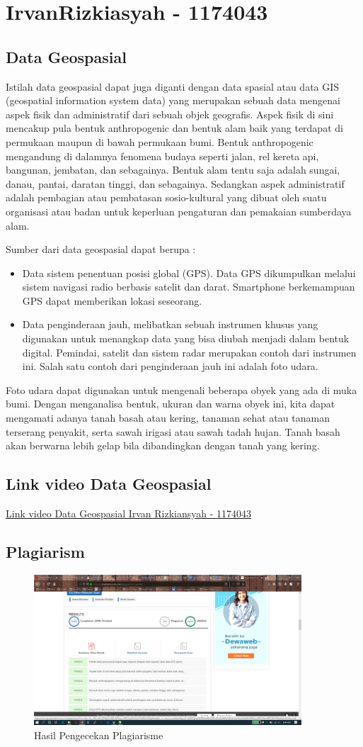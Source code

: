 \section{IrvanRizkiasyah - 1174043}
	\subsection{Data Geospasial}
	Istilah data geospasial dapat juga diganti dengan data spasial atau data GIS (geospatial information system data) yang merupakan sebuah data mengenai aspek fisik dan administratif dari sebuah objek geografis. Aspek fisik di sini mencakup pula bentuk anthropogenic dan bentuk alam baik yang terdapat di permukaan maupun di bawah permukaan bumi. Bentuk anthropogenic mengandung di dalamnya fenomena budaya seperti jalan, rel kereta api, bangunan, jembatan, dan sebagainya. Bentuk alam tentu saja adalah sungai, danau, pantai, daratan tinggi, dan sebagainya. Sedangkan aspek administratif adalah pembagian atau pembatasan sosio-kultural yang dibuat oleh suatu organisasi atau badan untuk keperluan pengaturan dan pemakaian sumberdaya alam.
	
	Sumber dari data geospasial dapat berupa :
	\begin{itemize}
		\item Data sistem penentuan posisi global (GPS). Data GPS dikumpulkan melalui sistem navigasi radio berbasis satelit dan darat. Smartphone berkemampuan GPS dapat memberikan lokasi seseorang.
		\item Data penginderaan jauh, melibatkan sebuah instrumen khusus yang digunakan untuk menangkap data yang bisa diubah menjadi dalam bentuk digital. Pemindai, satelit dan sistem radar merupakan contoh dari instrumen ini. Salah satu contoh dari penginderaan jauh ini adalah foto udara.
	\end{itemize}
	
	Foto udara dapat digunakan untuk mengenali beberapa obyek yang ada di muka bumi. Dengan menganalisa bentuk, ukuran dan warna obyek ini, kita dapat mengamati adanya tanah basah atau kering, tanaman sehat atau tanaman terserang penyakit, serta sawah irigasi atau sawah tadah hujan. Tanah basah akan berwarna lebih gelap bila dibandingkan dengan tanah yang kering.

	\subsection{Link video Data Geospasial}
		\href{https://youtu.be/w1NwuEcDHfA} {Link video Data Geospasial Irvan Rizkiansyah - 1174043}
		
	\subsection{Plagiarism}
	\begin{figure}[H]
		\includegraphics[width=10cm]{figures/1174043/Plagiarisme.png}
		\centering
		\caption{Hasil Pengecekan Plagiarisme}
	\end{figure}